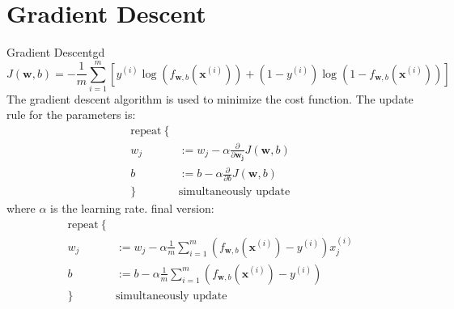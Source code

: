 \section{Gradient Descent}
\begin{thmbox}{Gradient Descent}{gd}
    \begin{equation}
        J(\mathbf{w}, b) = -\frac{1}{m} \sum_{i=1}^{m} \left[y^{(i)} \log\left(f_{\mathbf{w}, b}\left(\mathbf{x}^{(i)}\right)\right) + \left(1 - y^{(i)}\right) \log\left(1 - f_{\mathbf{w}, b}
        \left(\mathbf{x}^{(i)}\right)\right)\right]
    \end{equation}
    \hspace{2em}The gradient descent algorithm is used to minimize the cost function.
    The update rule for the parameters is:
    \begin{align*}
        \text{repeat}\ \{ &\\
        w_j &:= w_j - \alpha \frac{\partial}{\partial \mathbf{w_j}} J(\mathbf{w}, b)\\
        b &:= b - \alpha \frac{\partial}{\partial b} J(\mathbf{w}, b)\\
        \} \quad &\text{simultaneously update}
    \end{align*}
    where $\alpha$ is the learning rate.
    final version:
    \begin{align}
        \text{repeat}\ \{ &\nonumber\\
        w_j &:= w_j - \alpha \frac{1}{m} \sum_{i=1}^{m} \left(f_{\mathbf{w}, b}(\mathbf{x}^{(i)}) - y^{(i)}\right) x_j^{(i)}\\
        b &:= b - \alpha \frac{1}{m} \sum_{i=1}^{m} \left(f_{\mathbf{w}, b}(\mathbf{x}^{(i)}) - y^{(i)}\right)\\
        \} \quad &\text{simultaneously update} \nonumber
    \end{align}
\end{thmbox}

